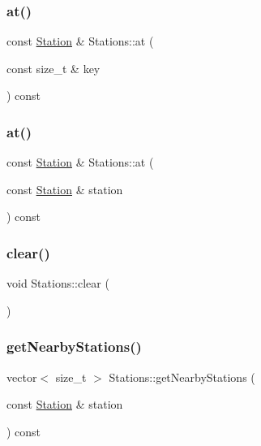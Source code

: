 \subsubsection{\texorpdfstring{at()}{at()}\hspace{0.1cm}{\footnotesize\ttfamily [3/4]}}
{\footnotesize\ttfamily const \mbox{\hyperlink{class_station}{Station}} \& Stations\+::at (\begin{DoxyParamCaption}\item[{const size\+\_\+t \&}]{key }\end{DoxyParamCaption}) const}

\mbox{\label{class_stations_a76175b88bafb7de42fae0a5d7518aac9}} 
\subsubsection{\texorpdfstring{at()}{at()}\hspace{0.1cm}{\footnotesize\ttfamily [4/4]}}
{\footnotesize\ttfamily const \mbox{\hyperlink{class_station}{Station}} \& Stations\+::at (\begin{DoxyParamCaption}\item[{const \mbox{\hyperlink{class_station}{Station}} \&}]{station }\end{DoxyParamCaption}) const}

\mbox{\label{class_stations_ae75fd812e17138fec710fd1e75032239}} 
\subsubsection{\texorpdfstring{clear()}{clear()}}
{\footnotesize\ttfamily void Stations\+::clear (\begin{DoxyParamCaption}{ }\end{DoxyParamCaption})}

\mbox{\label{class_stations_ac0438c6c8639d209dfc3937cfd993723}} 
\subsubsection{\texorpdfstring{get\+Nearby\+Stations()}{getNearbyStations()}\hspace{0.1cm}{\footnotesize\ttfamily [1/2]}}
{\footnotesize\ttfamily vector$<$ size\+\_\+t $>$ Stations\+::get\+Nearby\+Stations (\begin{DoxyParamCaption}\item[{const \mbox{\hyperlink{class_station}{Station}} \&}]{station }\end{DoxyParamCaption}) const}

